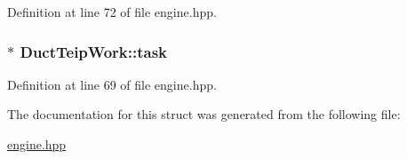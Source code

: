 Definition at line 72 of file engine.hpp.\hypertarget{struct_duct_teip_work_a9755914b2dce56c1395379086c365103}{
\subsubsection[{task}]{$\ast$ {\bf DuctTeipWork::task}}}
\label{struct_duct_teip_work_a9755914b2dce56c1395379086c365103}


Definition at line 69 of file engine.hpp.

The documentation for this struct was generated from the following file:\begin{DoxyCompactItemize}
\item 
\hyperlink{engine_8hpp}{engine.hpp}\end{DoxyCompactItemize}
